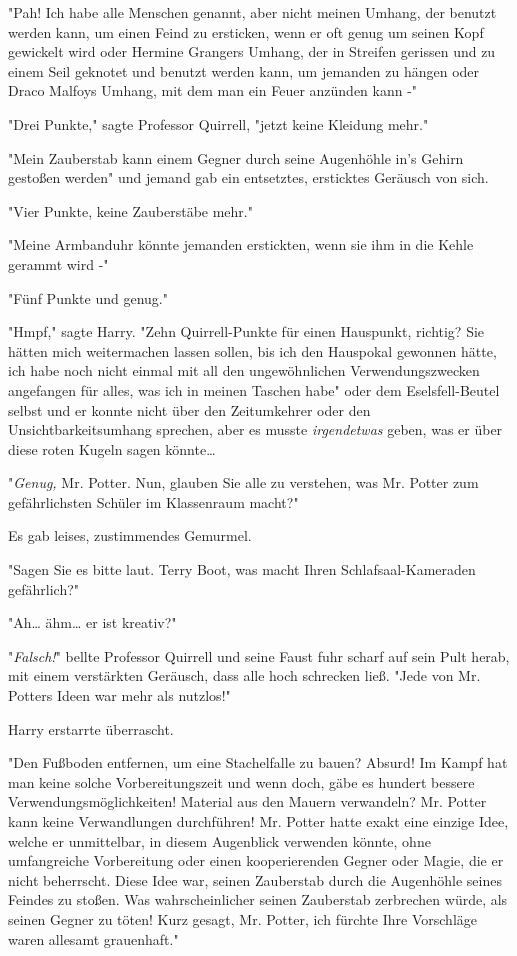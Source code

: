 {"Pah! Ich habe alle Menschen genannt, aber nicht meinen Umhang, der benutzt werden kann, um einen Feind zu ersticken, wenn er oft genug um seinen Kopf gewickelt wird oder Hermine Grangers Umhang, der in Streifen gerissen und zu einem Seil geknotet und benutzt werden kann, um jemanden zu hängen oder Draco Malfoys Umhang, mit dem man ein Feuer anzünden kann -"

"Drei Punkte," sagte Professor Quirrell, "jetzt keine Kleidung mehr."

"Mein Zauberstab kann einem Gegner durch seine Augenhöhle in's Gehirn gestoßen werden" und jemand gab ein entsetztes, ersticktes Geräusch von sich.

"Vier Punkte, keine Zauberstäbe mehr."

"Meine Armbanduhr könnte jemanden erstickten, wenn sie ihm in die Kehle gerammt wird -"

"Fünf Punkte und genug."

"Hmpf," sagte Harry. "Zehn Quirrell-Punkte für einen Hauspunkt, richtig? Sie hätten mich weitermachen lassen sollen, bis ich den Hauspokal gewonnen hätte, ich habe noch nicht einmal mit all den ungewöhnlichen Verwendungszwecken angefangen für alles, was ich in meinen Taschen habe" oder dem Eselsfell-Beutel selbst und er konnte nicht über den Zeitumkehrer oder den Unsichtbarkeitsumhang sprechen, aber es musste \emph{irgendetwas} geben, was er über diese roten Kugeln sagen könnte…

"\emph{Genug,} Mr. Potter. Nun, glauben Sie alle zu verstehen, was Mr. Potter zum gefährlichsten Schüler im Klassenraum macht?"

Es gab leises, zustimmendes Gemurmel.

"Sagen Sie es bitte laut. Terry Boot, was macht Ihren Schlafsaal-Kameraden gefährlich?"

"Ah… ähm… er ist kreativ?"

"\emph{Falsch!}" bellte Professor Quirrell und seine Faust fuhr scharf auf sein Pult herab, mit einem verstärkten Geräusch, dass alle hoch schrecken ließ. "Jede von Mr. Potters Ideen war mehr als nutzlos!"

Harry erstarrte überrascht.

"Den Fußboden entfernen, um eine Stachelfalle zu bauen? Absurd! Im Kampf hat man keine solche Vorbereitungszeit und wenn doch, gäbe es hundert bessere Verwendungsmöglichkeiten! Material aus den Mauern verwandeln? Mr. Potter kann keine Verwandlungen durchführen! Mr. Potter hatte exakt eine einzige Idee, welche er unmittelbar, in diesem Augenblick verwenden könnte, ohne umfangreiche Vorbereitung oder einen kooperierenden Gegner oder Magie, die er nicht beherrscht. Diese Idee war, seinen Zauberstab durch die Augenhöhle seines Feindes zu stoßen. Was wahrscheinlicher seinen Zauberstab zerbrechen würde, als seinen Gegner zu töten! Kurz gesagt, Mr. Potter, ich fürchte Ihre Vorschläge waren allesamt grauenhaft."

}
